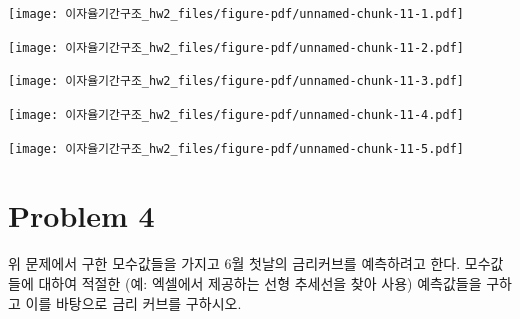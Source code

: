 \documentclass[
  a4paper,
  DIV=11,
  numbers=noendperiod]{scrreprt}
\newenvironment{Shaded}{\begin{snugshade}}{\end{snugshade}}
\newcommand{\NormalTok}[1]{\textcolor[rgb]{0.00,0.23,0.31}{#1}}
\newcommand{\SpecialCharTok}[1]{\textcolor[rgb]{0.37,0.37,0.37}{#1}}
\begin{document}
\begin{Shaded}
\end{Shaded}

\texttt{[image: 이자율기간구조\_hw2\_files/figure-pdf/unnamed-chunk-11-1.pdf]}

\begin{Shaded}
\end{Shaded}

\texttt{[image: 이자율기간구조\_hw2\_files/figure-pdf/unnamed-chunk-11-2.pdf]}

\begin{Shaded}
\end{Shaded}

\texttt{[image: 이자율기간구조\_hw2\_files/figure-pdf/unnamed-chunk-11-3.pdf]}

\begin{Shaded}
\end{Shaded}

\texttt{[image: 이자율기간구조\_hw2\_files/figure-pdf/unnamed-chunk-11-4.pdf]}

\begin{Shaded}
\end{Shaded}

\texttt{[image: 이자율기간구조\_hw2\_files/figure-pdf/unnamed-chunk-11-5.pdf]}

\section*{Problem 4}\label{problem-4}


위 문제에서 구한 모수값들을 가지고 6월 첫날의 금리커브를 예측하려고
한다. 모수값들에 대하여 적절한 (예: 엑셀에서 제공하는 선형 추세선을 찾아
사용) 예측값들을 구하고 이를 바탕으로 금리 커브를 구하시오.
\end{document}
